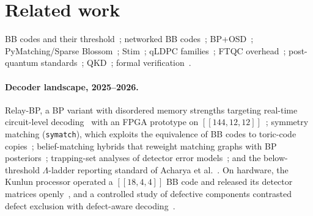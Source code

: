\documentclass[11pt,a4paper]{article}
\begin{document}
\section{Related work}

BB codes and their threshold~\cite{Bravyi2024};
networked BB codes~\cite{ShawRengaswamy2026};
BP+OSD~\cite{Roffe2020,ldpcPackage};
PyMatching/Sparse Blossom~\cite{Higgott2023,SparseBlossom2025};
Stim~\cite{Gidney2021};
qLDPC families~\cite{TillichZemor2014,PanteleevKalachev2022,LeverrierZemor2022};
FTQC overhead~\cite{Gottesman2014,FawziGrospellierLeverrier2018,
ChristandlFawziGoswami2025};
post-quantum standards~\cite{NISTFIPS203,NISTFIPS204,NISTFIPS205};
QKD~\cite{BennettBrassard1984,ShorPreskill2000,PortmannRenner2022};
formal verification~\cite{RandPaykinZdancewic2018,Hietala2021,
Bordg2021,Lewis2023}.

\paragraph{Decoder landscape, 2025--2026.}
Relay-BP, a BP variant with disordered memory strengths targeting real-time
circuit-level decoding~\cite{Muller2025relay} with an FPGA prototype on
$[[144,12,12]]$~\cite{Johnson2026relayfpga};
symmetry matching (\texttt{symatch}), which exploits the equivalence of BB
codes to toric-code copies~\cite{SahayBrown2026};
belief-matching hybrids that reweight matching graphs with BP
posteriors~\cite{Higgott2023belief};
trapping-set analyses of detector error
models~\cite{Pacenti2026trapping};
and the below-threshold $\Lambda$-ladder reporting standard of
Acharya et al.~\cite{Acharya2024lambda}.
On hardware, the Kunlun processor operated a $[[18,4,4]]$ BB code and
released its detector matrices openly~\cite{Wang2026kunlun}, and a
controlled study of defective components contrasted defect exclusion with
defect-aware decoding~\cite{Bartlett2026defect}.
\end{document}
